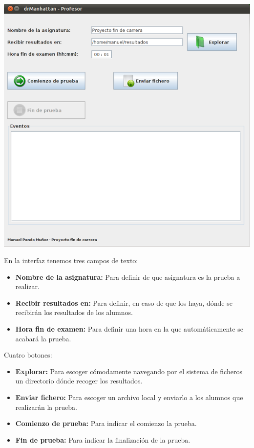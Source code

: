 \documentclass[11pt]{article}
\begin{document}
\begin{center}
    \includegraphics[width=.90\linewidth]{imagenes/GUIProfesor}
\end{center}

En la interfaz tenemos tres campos de texto:
\begin{itemize}
    \item {\bfseries Nombre de la asignatura:} Para definir de que asignatura es la prueba a realizar.
    \item {\bfseries Recibir resultados en:} Para definir, en caso de que los haya, dónde se recibirán los resultados de los alumnos.
    \item {\bfseries Hora fin de examen:} Para definir una hora en la que automáticamente se acabará la prueba.
\end{itemize}

Cuatro botones:

\begin{itemize}
    \item {\bfseries Explorar:} Para escoger cómodamente navegando por el sistema de ficheros un directorio dónde recoger los resultados.
    \item {\bfseries Enviar fichero:} Para escoger un archivo local y enviarlo a los alumnos que realizarán la prueba.
    \item {\bfseries Comienzo de prueba:} Para indicar el comienzo la prueba.
    \item {\bfseries Fin de prueba:} Para indicar la finalización de la prueba.
\end{itemize}
\end{document}
